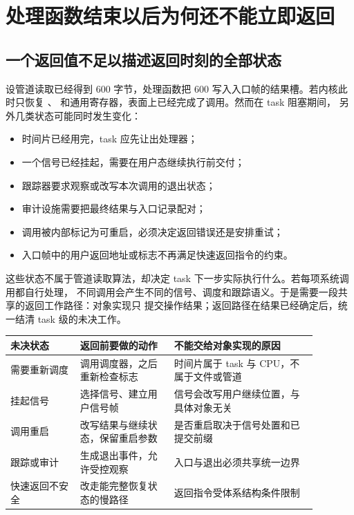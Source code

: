 \section{处理函数结束以后为何还不能立即返回}

\subsection{一个返回值不足以描述返回时刻的全部状态}

设管道读取已经得到 600 字节，处理函数把 600 写入入口帧的结果槽。若内核此时只恢复
、 和通用寄存器，表面上已经完成了调用。然而在 task 阻塞期间，
另外几类状态可能同时发生变化：

\begin{itemize}
\tightlist
\item 时间片已经用完，task 应先让出处理器；
\item 一个信号已经挂起，需要在用户态继续执行前交付；
\item 跟踪器要求观察或改写本次调用的退出状态；
\item 审计设施需要把最终结果与入口记录配对；
\item 调用被内部标记为可重启，必须决定返回错误还是安排重试；
\item 入口帧中的用户返回地址或标志不再满足快速返回指令的约束。
\end{itemize}

这些状态不属于管道读取算法，却决定 task 下一步实际执行什么。若每项系统调用都自行处理，
不同调用会产生不同的信号、调度和跟踪语义。于是需要一段共享的返回工作路径：对象实现只
提交操作结果；返回路径在结果已经确定后，统一结清 task 级的未决工作。

\begin{longtable}{|L{0.20\linewidth}|L{0.27\linewidth}|L{0.41\linewidth}|}
\hline
未决状态 & 返回前要做的动作 & 不能交给对象实现的原因 \\ \hline
需要重新调度 & 调用调度器，之后重新检查标志 & 时间片属于 task 与 CPU，不属于文件或管道 \\ \hline
挂起信号 & 选择信号、建立用户信号帧 & 信号会改写用户继续位置，与具体对象无关 \\ \hline
调用重启 & 改写结果与继续状态，保留重启参数 & 是否重启取决于信号处置和已提交前缀 \\ \hline
跟踪或审计 & 生成退出事件，允许受控观察 & 入口与退出必须共享统一边界 \\ \hline
快速返回不安全 & 改走能完整恢复状态的慢路径 & 返回指令受体系结构条件限制 \\ \hline
\end{longtable}

